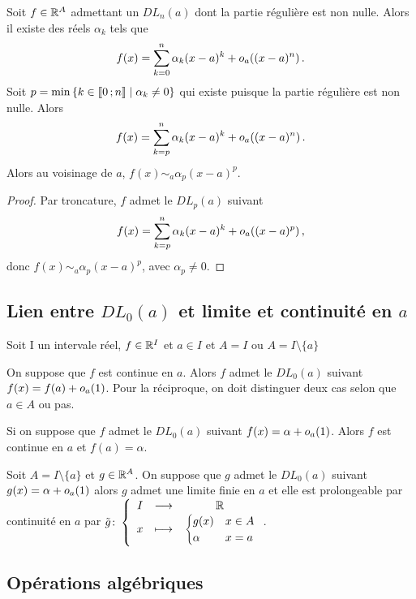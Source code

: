 Soit \(f \in \mathbb{R}^A\) admettant un \(DL_n(a)\) dont la partie régulière est non nulle. Alors il existe des réels \(\alpha_k\) tels que
\begin{equation}
  f(x)=\sum_{k=0}^n \alpha_k (x-a)^k+o\mathopen{}_{a}\left((x-a)^n\right).
\end{equation}
Soit \(p=\min\left\{k \in \mathopen{\llbracket}0\mathclose{}\mathpunct{};n\mathclose{\rrbracket}\mathrel{}\middle|\mathrel{}\alpha_k \neq 0\right\}\) qui existe puisque la partie régulière est non nulle. Alors
\begin{equation}
  f(x)=\sum_{k=p}^n \alpha_k (x-a)^k +o\mathopen{}_{a}\left((x-a)^n\right).
\end{equation}
Alors au voisinage de \(a\), \(f(x) \sim_a \alpha_p(x-a)^p\).
\begin{proof}
  Par troncature, \(f\) admet le \(DL_p(a)\) suivant
\begin{equation}
  f(x)=\sum_{k=p}^n \alpha_k (x-a)^k +o\mathopen{}_{a}\left((x-a)^p\right),
\end{equation}
donc \(f(x) \sim_a \alpha_p(x-a)^p\), avec \(\alpha_p \neq 0\).
\end{proof}

\subsection{Lien entre \(DL_0(a)\) et limite et continuité en \(a\)}

Soit I un intervale réel, \(f \in \mathbb{R}^I\) et \(a \in I\) et \(A=I\) ou \(A=I\setminus\{a\}\)
\begin{prop}
   On suppose que \(f\) est continue en \(a\). Alors \(f\) admet le \(DL_0(a)\) suivant \(f(x)=f(a)+o\mathopen{}_{a}\left(1\right)\). Pour la réciproque, on doit distinguer deux cas selon que \(a \in A\) ou pas.
\end{prop}
\begin{prop}
  Si on suppose que \(f\) admet le \(DL_0(a)\) suivant \(f(x)=\alpha+o\mathopen{}_{a}\left(1\right)\). Alors \(f\) est continue en \(a\) et \(f(a)=\alpha\). 
\end{prop}
\begin{prop}
  Soit \(A=I\setminus\{a\}\) et \(g \in \mathbb{R}^A\). On suppose que \(g\) admet le \(DL_0(a)\) suivant \(g(x)= \alpha +o\mathopen{}_{a}\left(1\right)\) alors \(g\) admet une limite finie en \(a\) et elle est prolongeable par continuité en \(a\) par \(\tilde{g}\colon \left\{\begin{array}{ccc} I & \longrightarrow &\mathbb{R}\\ x & \longmapsto & \begin{cases} g(x) & x \in A \\ \alpha & x=a\end{cases} \end{array} \right.\).
\end{prop}

\subsection{Opérations algébriques}

